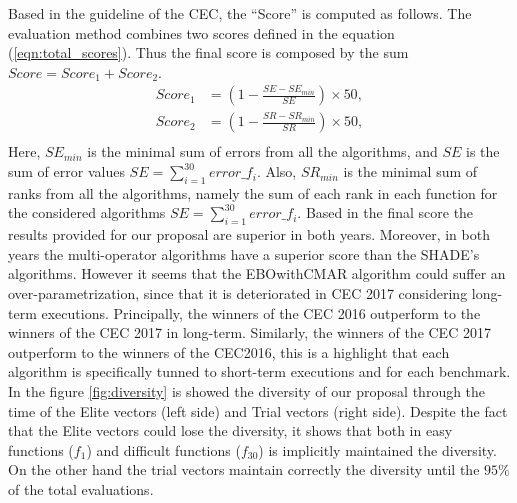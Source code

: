 Based in the guideline of the CEC, the ``Score'' is computed as follows.
%
The evaluation method combines two scores defined in the equation (\ref{eqn:total_scores}).
%
Thus the final score is composed by the sum $Score = Score_1 + Score_2$.
%
\begin{equation}\label{eqn:total_scores}
\begin{split}
Score_1 &= \left (1 - \frac{SE - SE_{min}}{SE} \right) \times 50, \\
Score_2 &= \left  (1 - \frac{SR - SR_{min}}{SR} \right ) \times 50, \\
\end{split}
\end{equation}
Here, $SE_{min}$ is the minimal sum of errors from all the algorithms, and $SE$ is the sum of error values $SE = \sum_{i=1}^{30} error\_f_i$.
%
Also, $SR_{min}$ is the minimal sum of ranks from all the algorithms, namely the sum of each rank in each function for the considered algorithms $SE = \sum_{i=1}^{30} error\_f_i$.
%
Based in the final score the results provided for our proposal are superior in both years.
%
Moreover, in both years the multi-operator algorithms have a superior score than the SHADE's algorithms.
%
However it seems that the EBOwithCMAR algorithm could suffer an over-parametrization, since that it is deteriorated in CEC 2017 considering long-term executions.
%
Principally, the winners of the CEC 2016 outperform to the winners of the CEC 2017 in long-term.
%
Similarly, the winners of the CEC 2017 outperform to the winners of the CEC2016, this is a highlight that each algorithm is specifically tunned to short-term executions and for each benchmark.
%
In the figure \ref{fig:diversity} is showed the diversity of our proposal through the time of the Elite vectors (left side) and Trial vectors (right side).
%
Despite the fact that the Elite vectors could lose the diversity, it shows that both in easy functions ($f_1$) and difficult functions ($f_{30}$) is implicitly maintained the diversity.
%
On the other hand the trial vectors maintain correctly the diversity until the $95\%$ of the total evaluations.

